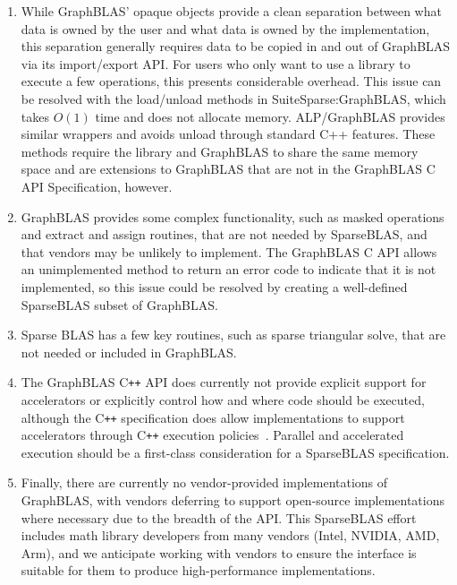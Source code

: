 \documentclass[manuscript,review]{acmart}
\newcommand{\cplusplus}{C\texttt{++}\xspace}
\begin{document}
\begin{enumerate}
\item While GraphBLAS' opaque objects
provide a clean separation between what data is owned by the user and what data
is owned by the implementation, this separation generally requires data to be
copied in and out of GraphBLAS via its import/export API.  For users who only
want to use a library to execute a few operations, this presents considerable
overhead.  This issue can be resolved with the load/unload methods in
SuiteSparse:GraphBLAS, which takes $O(1)$ time and does not allocate memory. 
ALP/GraphBLAS provides similar wrappers and avoids unload through standard C++ features.
These methods require the library and GraphBLAS to share the same memory space
and are extensions to GraphBLAS that are not in the GraphBLAS C API
Specification, however.

\item GraphBLAS provides some complex functionality, such as
masked operations and extract and assign routines, that are not needed by
SparseBLAS, and that vendors may be unlikely to implement.
The GraphBLAS C API allows an unimplemented method to return an error code to
indicate that it is not implemented, so this issue could be resolved by
creating a well-defined SparseBLAS subset of GraphBLAS.

\item Sparse
BLAS has a few key routines, such as sparse triangular solve, that are not needed or
included in GraphBLAS.  

\item
The GraphBLAS \cplusplus API does currently not provide explicit support
for accelerators or explicitly control how and where code should be
executed, although the \cplusplus specification does allow
implementations to support accelerators through \cplusplus execution
policies~\cite{9150467,graphblascppspec}. Parallel and accelerated
execution should be a first-class consideration for a SparseBLAS
specification.

\item
Finally, there are currently no vendor-provided implementations of GraphBLAS, with vendors deferring to support open-source implementations where necessary due to the breadth of the API.  This SparseBLAS effort includes math library developers from many vendors (Intel, NVIDIA, AMD, Arm), and we anticipate working with vendors to ensure the interface is suitable for them to produce high-performance implementations.

\end{enumerate}
\end{document}
